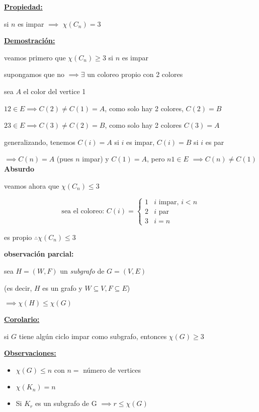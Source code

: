 \documentclass{article}
\begin{document}
\underline{\textbf{Propiedad:}}

si $n$ es impar $\implies$ $\chi(C_n) = 3$ \bigskip

\underline{\textbf{Demostración:}}

veamos primero que $\chi(C_n) \geq 3$ si $n$ es impar \bigskip

supongamos que no $\implies \exists$ un coloreo propio con 2 colores \bigskip

sea $A$ el color del vertice 1

$12 \in E \implies C(2) \neq C(1) = A$, como solo hay 2 colores,  $C(2) = B$

$23 \in E \implies C(3) \neq C(2) = B$, como solo hay 2 colores $C(3) = A$ \bigskip

generalizando, tenemos $C(i) = A$ si $i$ es impar, $C(i) = B$ si $i$ es par \bigskip

$\implies C(n) = A$ (pues $n$ impar) y $C(1) = A$, pero $n1 \in E$
$\implies C(n) \neq C(1)$ \textbf{Absurdo} \bigskip

veamos ahora que $\chi(C_n) \leq 3$


\[
\text{sea el coloreo: }
C(i) =
\begin{cases}
1 & i \text{ impar, } i < n \\
2 & i \text{ par} \\
3 & i = n
\end{cases}
\]

es propio $\therefore \chi(C_n) \leq 3$ \bigskip

\textbf{observación parcial:}

sea $H = (W, F)$ un \textit{subgrafo} de $G = (V, E)$ 

(es decir, $H$ es un grafo y $W \subseteq V, F \subseteq E$)

\(\implies \chi(H) \leq \chi(G)\) \bigskip

\underline{\textbf{Corolario:}}

si $G$ tiene algún ciclo impar como subgrafo, entonces $\chi(G) \geq 3$ \bigskip

\underline{\textbf{Observaciones:}}

\begin{itemize}
\item $\chi(G) \leq n$ con $n =$ número de vertices
\item $\chi(K_n) = n$
\item Si $K_r$ es un subgrafo de G $\implies r \leq \chi(G)$
\end{itemize}

\newpage
\end{document}
